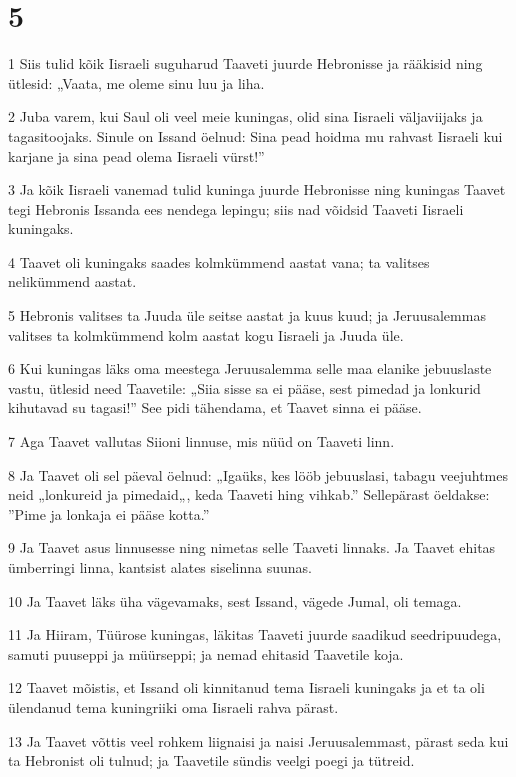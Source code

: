 \chapter{5}

\par 1 Siis tulid kõik Iisraeli suguharud Taaveti juurde Hebronisse ja rääkisid ning ütlesid: „Vaata, me oleme sinu luu ja liha.
\par 2 Juba varem, kui Saul oli veel meie kuningas, olid sina Iisraeli väljaviijaks ja tagasitoojaks. Sinule on Issand öelnud: Sina pead hoidma mu rahvast Iisraeli kui karjane ja sina pead olema Iisraeli vürst!”
\par 3 Ja kõik Iisraeli vanemad tulid kuninga juurde Hebronisse ning kuningas Taavet tegi Hebronis Issanda ees nendega lepingu; siis nad võidsid Taaveti Iisraeli kuningaks.
\par 4 Taavet oli kuningaks saades kolmkümmend aastat vana; ta valitses nelikümmend aastat.
\par 5 Hebronis valitses ta Juuda üle seitse aastat ja kuus kuud; ja Jeruusalemmas valitses ta kolmkümmend kolm aastat kogu Iisraeli ja Juuda üle.
\par 6 Kui kuningas läks oma meestega Jeruusalemma selle maa elanike jebuuslaste vastu, ütlesid need Taavetile: „Siia sisse sa ei pääse, sest pimedad ja lonkurid kihutavad su tagasi!” See pidi tähendama, et Taavet sinna ei pääse.
\par 7 Aga Taavet vallutas Siioni linnuse, mis nüüd on Taaveti linn.
\par 8 Ja Taavet oli sel päeval öelnud: „Igaüks, kes lööb jebuuslasi, tabagu veejuhtmes neid „lonkureid ja pimedaid„, keda Taaveti hing vihkab.” Sellepärast öeldakse: ”Pime ja lonkaja ei pääse kotta.”
\par 9 Ja Taavet asus linnusesse ning nimetas selle Taaveti linnaks. Ja Taavet ehitas ümberringi linna, kantsist alates siselinna suunas.
\par 10 Ja Taavet läks üha vägevamaks, sest Issand, vägede Jumal, oli temaga.
\par 11 Ja Hiiram, Tüürose kuningas, läkitas Taaveti juurde saadikud seedripuudega, samuti puuseppi ja müürseppi; ja nemad ehitasid Taavetile koja.
\par 12 Taavet mõistis, et Issand oli kinnitanud tema Iisraeli kuningaks ja et ta oli ülendanud tema kuningriiki oma Iisraeli rahva pärast.
\par 13 Ja Taavet võttis veel rohkem liignaisi ja naisi Jeruusalemmast, pärast seda kui ta Hebronist oli tulnud; ja Taavetile sündis veelgi poegi ja tütreid.
